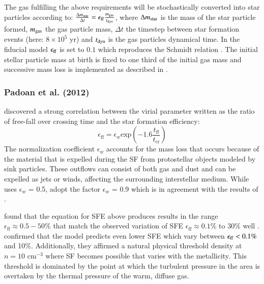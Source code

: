 \documentclass{aa}
\begin{document}
The gas fulfilling the above requirements will be stochastically converted into star particles according to:
$\frac{\Delta  m_{\rm star}}{\Delta t}=\epsilon_{\rm ff}\frac{m_{\rm  gas}}{t_{\rm dyn}}$, where  $\Delta m_{\rm star}$  is the mass of the star particle formed, $m_{\rm  gas}$ the gas particle mass, $\Delta  t$ the timestep between star formation events (here: $8 \times 10^5$  yr) and $t_{\rm dyn}$ is the gas particles dynamical time. In the fiducial model $\epsilon_{\rm ff}$ is set to $0.1$ which reproduces the \citet{Kennicutt1998} Schmidt relation \citep{Stinson2006}. The initial stellar particle mass at birth is fixed to one third of the initial gas mass and successive mass loss is implemented as described in \citet{Buck2021}.

\subsubsection{Padoan et al. (2012)}

\cite{Padoan_2012} discovered a strong correlation between the virial parameter written as the ratio of free-fall over crossing time and the star formation efficiency:
\begin{equation}\label{eff_pad}
    \epsilon_{\mathrm{ff}}=\epsilon_w \mathrm{exp}\left(-1.6 \frac{t_{\mathrm{ff}}}{t_{\mathrm{cr}}}\right)
\end{equation}
The normalization coefficient $\epsilon_w$ accounts for the mass loss that occurs because of the material that is expelled during the SF from protostellar objects modeled by sink particles. These outflows can consist of both gas and dust and can be expelled as jets or winds, affecting the surrounding interstellar medium. While \cite{Padoan_2012} uses $\epsilon_w$ = 0.5, \cite{Semenov_2016} adopt the factor $\epsilon_w$ = 0.9 which is in agreement with the results of \cite{Federrath_2014}.

\cite{Padoan_2012} found that the equation for SFE above produces results in the range \\ $\epsilon_{\mathrm{ff}} \approx 0.5 - 50\%$ that match the observed variation of SFE $\epsilon_{\mathrm{ff}} \approx 0.1\%$ to 30$\%$ well \citep{Heiderman_2010}. \cite{Semenov_2016} confirmed that the model predicts even lower SFE which vary between $\epsilon_{\rm ff} < 0.1\%$ and 10$\%$. Additionally, they affirmed a natural physical threshold density at $n = 10 \, \, \mathrm{cm}^{-3}$ where SF becomes possible that varies with the metallicity. This threshold is dominated by the point at which the turbulent pressure in the area is overtaken by the thermal pressure of the warm, diffuse gas.
\end{document}
